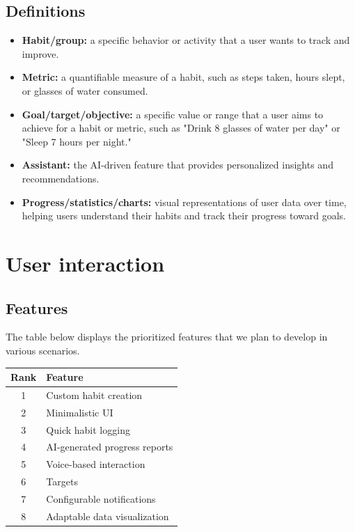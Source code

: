 \documentclass{article}
\begin{document}
\subsection{Definitions}

\begin{itemize}
    \item \textbf{Habit/group:} a specific behavior or activity that a user wants to track and improve.
    \item \textbf{Metric:} a quantifiable measure of a habit, such as steps taken, hours slept, or glasses of water consumed.
    \item \textbf{Goal/target/objective:} a specific value or range that a user aims to achieve for a habit or metric, such as "Drink 8 glasses of water per day" or "Sleep 7 hours per night."
    \item \textbf{Assistant:} the AI-driven feature that provides personalized insights and recommendations.
    \item \textbf{Progress/statistics/charts:} visual representations of user data over time, helping users understand their habits and track their progress toward goals.
\end{itemize}

\section{User interaction}

\subsection{Features}

The table below displays the prioritized features that we plan to develop in various scenarios.

\begin{table}[H]
    \centering
    \begin{tabularx}{0.5\textwidth}{c|X}
        \hline
        \textbf{Rank} & \textbf{Feature} \\
        \hline
        1 & Custom habit creation \\
        2 & Minimalistic UI \\
        3 & Quick habit logging  \\
        4 & AI-generated progress reports  \\
        5 & Voice-based interaction  \\
        6 & Targets \\
        7 & Configurable notifications  \\
        8 & Adaptable data visualization \\
        \hline
    \end{tabularx}
\end{table}
\end{document}
